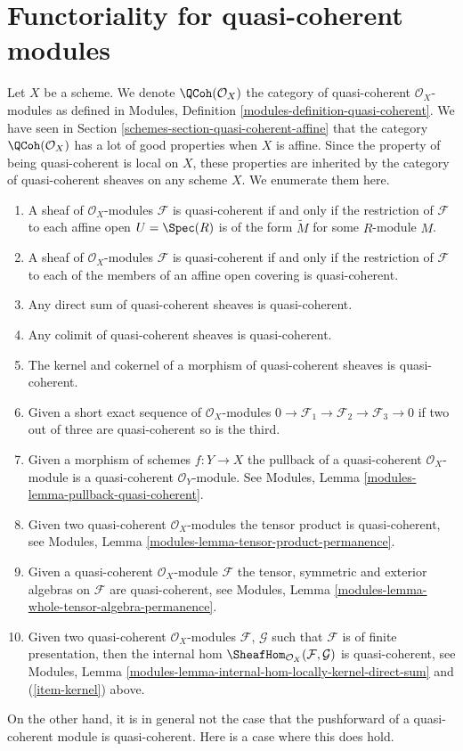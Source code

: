\section{Functoriality for quasi-coherent modules}
\label{schemes-section-quasi-coherent}
Let $X$ be a scheme. We denote $\QCoh(\mathcal{O}_X)$ the
category of quasi-coherent $\mathcal{O}_X$-modules as defined in
Modules, Definition \ref{modules-definition-quasi-coherent}.
We have seen in
Section \ref{schemes-section-quasi-coherent-affine}
that the category $\QCoh(\mathcal{O}_X)$ has a lot of good properties
when $X$ is affine. Since the property of being quasi-coherent is
local on $X$, these properties are inherited by the category
of quasi-coherent sheaves on any scheme $X$. We enumerate them here.
\begin{enumerate}
\item A sheaf of $\mathcal{O}_X$-modules $\mathcal{F}$ is
quasi-coherent if and only if the restriction of $\mathcal{F}$
to each affine open $U = \Spec(R)$ is of the form
$\widetilde M$ for some $R$-module $M$.
\item A sheaf of $\mathcal{O}_X$-modules $\mathcal{F}$ is
quasi-coherent if and only if the restriction of $\mathcal{F}$
to each of the members of an affine open covering is quasi-coherent.
\item Any direct sum of quasi-coherent sheaves is quasi-coherent.
\item Any colimit of quasi-coherent sheaves is quasi-coherent.
\item
\label{schemes-item-kernel}
The kernel and cokernel of a morphism of quasi-coherent sheaves
is quasi-coherent.
\item Given a short exact sequence of $\mathcal{O}_X$-modules
$0 \to \mathcal{F}_1 \to \mathcal{F}_2 \to \mathcal{F}_3 \to 0$
if two out of three are quasi-coherent so is the third.
\item Given a morphism of schemes $f : Y \to X$ the pullback
of a quasi-coherent $\mathcal{O}_X$-module is a quasi-coherent
$\mathcal{O}_Y$-module. See
Modules, Lemma \ref{modules-lemma-pullback-quasi-coherent}.
\item Given two quasi-coherent $\mathcal{O}_X$-modules
the tensor product is quasi-coherent, see
Modules, Lemma \ref{modules-lemma-tensor-product-permanence}.
\item Given a quasi-coherent $\mathcal{O}_X$-module $\mathcal{F}$
the tensor, symmetric and exterior algebras on $\mathcal{F}$
are quasi-coherent, see
Modules, Lemma \ref{modules-lemma-whole-tensor-algebra-permanence}.
\item Given two quasi-coherent $\mathcal{O}_X$-modules
$\mathcal{F}$, $\mathcal{G}$ such that $\mathcal{F}$
is of finite presentation, then the internal hom
$\SheafHom_{\mathcal{O}_X}(\mathcal{F}, \mathcal{G})$
is quasi-coherent, see
Modules, Lemma \ref{modules-lemma-internal-hom-locally-kernel-direct-sum}
and (\ref{item-kernel}) above.
\end{enumerate}
On the other hand, it is in general not the case that the
pushforward of a quasi-coherent module is quasi-coherent.
Here is a case where this does hold.


